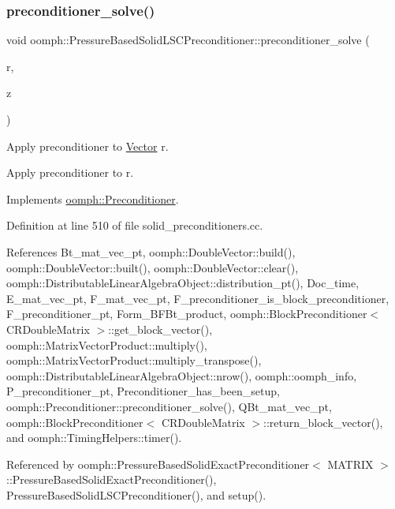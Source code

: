 \subsubsection{\texorpdfstring{preconditioner\+\_\+solve()}{preconditioner\_solve()}}
{\footnotesize\ttfamily void oomph\+::\+Pressure\+Based\+Solid\+L\+S\+C\+Preconditioner\+::preconditioner\+\_\+solve (\begin{DoxyParamCaption}\item[{const \hyperlink{classoomph_1_1DoubleVector}{Double\+Vector} \&}]{r,  }\item[{\hyperlink{classoomph_1_1DoubleVector}{Double\+Vector} \&}]{z }\end{DoxyParamCaption})\hspace{0.3cm}{\ttfamily [virtual]}}



Apply preconditioner to \hyperlink{classoomph_1_1Vector}{Vector} r. 

Apply preconditioner to r. 

Implements \hyperlink{classoomph_1_1Preconditioner_ace1199369e4465cd2b9a34884bb64ec8}{oomph\+::\+Preconditioner}.



Definition at line 510 of file solid\+\_\+preconditioners.\+cc.



References Bt\+\_\+mat\+\_\+vec\+\_\+pt, oomph\+::\+Double\+Vector\+::build(), oomph\+::\+Double\+Vector\+::built(), oomph\+::\+Double\+Vector\+::clear(), oomph\+::\+Distributable\+Linear\+Algebra\+Object\+::distribution\+\_\+pt(), Doc\+\_\+time, E\+\_\+mat\+\_\+vec\+\_\+pt, F\+\_\+mat\+\_\+vec\+\_\+pt, F\+\_\+preconditioner\+\_\+is\+\_\+block\+\_\+preconditioner, F\+\_\+preconditioner\+\_\+pt, Form\+\_\+\+B\+F\+Bt\+\_\+product, oomph\+::\+Block\+Preconditioner$<$ C\+R\+Double\+Matrix $>$\+::get\+\_\+block\+\_\+vector(), oomph\+::\+Matrix\+Vector\+Product\+::multiply(), oomph\+::\+Matrix\+Vector\+Product\+::multiply\+\_\+transpose(), oomph\+::\+Distributable\+Linear\+Algebra\+Object\+::nrow(), oomph\+::oomph\+\_\+info, P\+\_\+preconditioner\+\_\+pt, Preconditioner\+\_\+has\+\_\+been\+\_\+setup, oomph\+::\+Preconditioner\+::preconditioner\+\_\+solve(), Q\+Bt\+\_\+mat\+\_\+vec\+\_\+pt, oomph\+::\+Block\+Preconditioner$<$ C\+R\+Double\+Matrix $>$\+::return\+\_\+block\+\_\+vector(), and oomph\+::\+Timing\+Helpers\+::timer().



Referenced by oomph\+::\+Pressure\+Based\+Solid\+Exact\+Preconditioner$<$ M\+A\+T\+R\+I\+X $>$\+::\+Pressure\+Based\+Solid\+Exact\+Preconditioner(), Pressure\+Based\+Solid\+L\+S\+C\+Preconditioner(), and setup().

